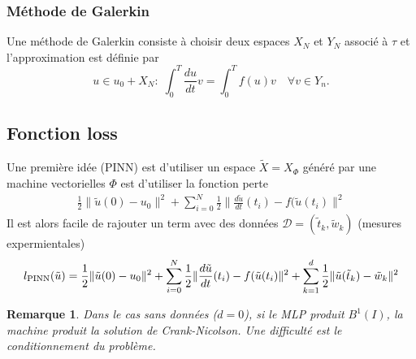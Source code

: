 \documentclass[11pt,a4paper, french]{article}
\newcommand{\norm}[1]{\|#1\|}
\newtheorem{remark}[theorem]{Remarque}
\begin{document}
\subsubsection{Méthode de Galerkin}
%
Une méthode de Galerkin consiste à choisir deux espaces $X_N$ et $Y_N$ associé à $\tau$ et l'approximation est définie par
%
\begin{equation}\label{equation:}
u\in u_0+X_N :\;\int_0^T \frac{du}{dt} v =  \int_0^T f(u) v\quad \forall v\in Y_n.
\end{equation}
%
%
\subsection{Fonction loss}\label{subsec:}
%
Une première idée  (PINN) est d'utiliser un espace $\tilde X=X_{\Phi}$ généré par une machine vectorielles $\Phi$ est d'utiliser la fonction perte
\begin{align*}
\frac12\norm{\tilde u(0)-u_0}^2 + \sum_{i=0}^N \frac12\norm{\frac{d\tilde u}{dt}(t_i) - f(\tilde u(t_i)}^2
\end{align*}
Il est alors facile de rajouter un term avec des données $\mathcal D=(\tilde t_k, \tilde w_k)$ (mesures expermientales)
\begin{align*}
l_{\rm PINN}(\tilde u) = \frac12\norm{\tilde u(0)-u_0}^2 + \sum_{i=0}^N \frac12\norm{\frac{d\tilde u}{dt}(t_i) - f(\tilde u(t_i)}^2 + \sum_{k=1}^d \frac12\norm{\tilde u(\tilde t_k) - \tilde w_k}^2
\end{align*}
%
%
\begin{remark}\label{remark:}
Dans le cas sans données ($d=0$), si le MLP produit $B^1(I)$, la machine produit la solution de Crank-Nicolson. Une difficulté est 
le conditionnement du problème.
\end{remark}
%
%
\end{document}

